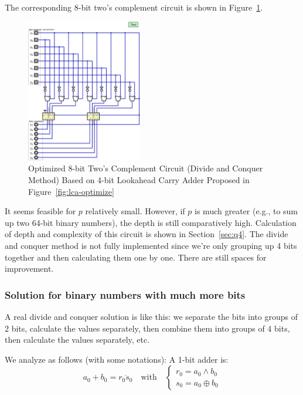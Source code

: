 \documentclass[conference]{IEEEtran}
\begin{document}
The corresponding 8-bit two's complement circuit is shown in Figure~\ref{fig:tc-dq-optimize}.


\begin{figure}[h!]
    \centering
    \includegraphics[width=0.45\textwidth]{assets/twos_complement_dq_copy.png}
    \caption{Optimized 8-bit Two's Complement Circuit (Divide and Conquer Method) Based on 4-bit Lookahead Carry Adder Proposed in Figure~\ref{fig:lca-optimize}}
    \label{fig:tc-dq-optimize}
    \end{figure}
It seems feasible for $p$ relatively small. However, if $p$ is much greater (e.g., to sum up two 64-bit binary numbers), the depth is still
comparatively high. Calculation of depth and complexity of this circuit is shown in Section~\ref{sec:q4}. The divide and conquer method is not fully implemented since we're only grouping up 4 bits together and then calculating them one by one. There are still spaces for improvement.


\subsubsection{Solution for binary numbers with much more bits}\label{sec:3-B}

A real divide and conquer solution is like this: we separate the bits into groups of 2 bits, calculate the values separately, then combine them into groups of 4 bits, then calculate the values separately, etc.

We analyze as follows (with some notations):
A 1-bit adder is: 
\begin{equation}
    a_0 + b_0 = \overline{r_0s_0} \quad \text{with}\quad \begin{cases}
        r_0 = a_0 \wedge b_0 \\
        s_0 = a_0 \oplus b_0
\end{cases}
\end{equation}
\end{document}
